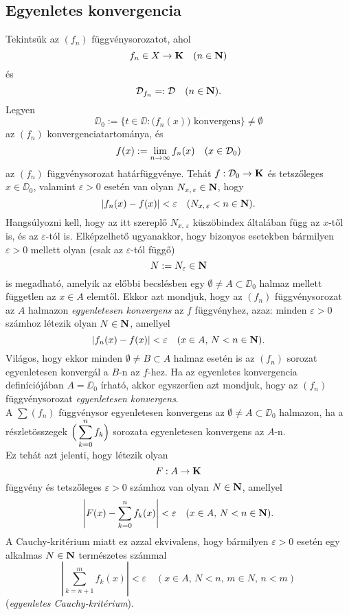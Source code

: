 \subsection{Egyenletes konvergencia}
Tekintsük az $(f_n)$ függvénysorozatot, ahol
\[
	f_n \in X \to \mathbf{K} \quad (n \in \mathbf{N})
\]
és
\[
	\mathcal{D}_{f_n} =: \mathcal{D} \quad (n \in \mathbf{N}).
\]
Legyen
\[
	\DD_0 := \Big\{ t \in \DD : \Big( f_n(x)\Big) \text { konvergens} \Big\} \neq \emptyset
\]
az $(f_n)$ konvergenciatartománya, és 
\[
	f(x) := \lim_{n \to \infty} f_n(x) \quad (x \in \mathcal{D}_0)
\]
az $(f_n)$ függvénysorozat határfüggvénye. Tehát $f : \mathcal{D}_0 \to \mathbf{K}$ és tetszőleges $x \in \DD_0$, valamint $\varepsilon > 0$ esetén van olyan $N_{x, \, \varepsilon} \in \mathbf{N}$, hogy
\[
	|f_n(x) - f(x)| < \varepsilon \quad (N_{x, \, \varepsilon} < n \in \mathbf{N}).
\]
Hangsúlyozni kell, hogy az itt szereplő $N_{x, \, \varepsilon}$ küszöbindex általában függ az $x$-től is, és az $\varepsilon$-tól is. Elképzelhető ugyanakkor, hogy bizonyos esetekben bármilyen $\varepsilon > 0$ mellett olyan (csak az $\varepsilon$-tól függő)
\[
	N := N_\varepsilon \in \mathbf{N}
\]
is megadható, amelyik az előbbi becslésben egy $\emptyset \neq A \subset \DD_0$ halmaz mellett független az $x \in A$ elemtől. Ekkor azt mondjuk, hogy az $(f_n)$ függvénysorozat az $A$ halmazon \textit{egyenletesen konvergens} az $f$ függvényhez, azaz: minden $\varepsilon > 0$ számhoz létezik olyan $N \in \mathbf{N}$, amellyel
\[
	|f_n(x) - f(x)| < \varepsilon \quad (x \in A, \, N < n \in \mathbf{N}).
\]
Világos, hogy ekkor minden $\emptyset \neq B \subset A$ halmaz esetén is az $(f_n)$ sorozat egyenletesen konvergál a $B$-n az $f$-hez. Ha az egyenletes konvergencia definíciójában $A = \DD_0$ írható, akkor egyszerűen azt mondjuk, hogy az $(f_n)$ függvénysorozat \textit{egyenletesen konvergens}.\\

A $\sum(f_n)$ függvénysor egyenletesen konvergens az $\emptyset \neq A \subset \DD_0$ halmazon, ha a részletösszegek $\displaystyle \Big( \sum_{k=0}^n f_k \Big)$ sorozata egyenletesen konvergens az $A$-n.\\

Ez tehát azt jelenti, hogy létezik olyan
\[
	F : A \to \mathbf{K}
\]
függvény és tetszőleges $\varepsilon > 0$ számhoz van olyan $N \in \mathbf{N}$, amellyel
\[
	\left| F(x) - \sum_{k=0}^n f_k(x) \right| < \varepsilon \quad (x \in A, \, N < n \in \mathbf{N}).
\]
A Cauchy-kritérium miatt ez azzal ekvivalens, hogy bármilyen $\varepsilon > 0$ esetén egy alkalmas $N \in \mathbf{N}$ természetes számmal
\[
	\left|  \sum_{k=n+1}^m f_k(x) \right| < \varepsilon \quad (x \in A, \, N < n, \, m \in N, \, n < m)
\]
(\textit{egyenletes Cauchy-kritérium}).